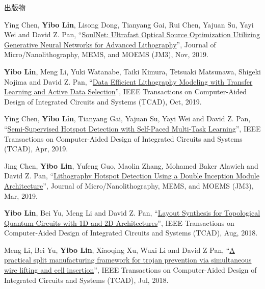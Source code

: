 \begin{rSection}{出版物}
\begin{description}[font=\normalfont]
{}
            

\item[{[J16]}]{
        Ying Chen, \textbf{Yibo Lin}, Lisong Dong, Tianyang Gai, Rui Chen, Yajuan Su, Yayi Wei and David Z. Pan, 
    ``\href{https://dx.doi.org/10.1117/1.JMM.18.4.043506}{SoulNet: Ultrafast Optical Source Optimization Utilizing Generative Neural Networks for Advanced Lithography}'', 
    Journal of Micro/Nanolithography, MEMS, and MOEMS (JM3), Nov, 2019.
    
}
            

\item[{[J15]}]{
        \textbf{Yibo Lin}, Meng Li, Yuki Watanabe, Taiki Kimura, Tetsuaki Matsunawa, Shigeki Nojima and David Z. Pan, 
    ``\href{https://doi.org/10.1109/TCAD.2018.2864251}{Data Efficient Lithography Modeling with Transfer Learning and Active Data Selection}'', 
    IEEE Transactions on Computer-Aided Design of Integrated Circuits and Systems (TCAD), Oct, 2019.
    
}
            

\item[{[J14]}]{
        Ying Chen, \textbf{Yibo Lin}, Tianyang Gai, Yajuan Su, Yayi Wei and David Z. Pan, 
    ``\href{https://doi.org/10.1109/TCAD.2019.2912948}{Semi-Supervised Hotspot Detection with Self-Paced Multi-Task Learning}'', 
    IEEE Transactions on Computer-Aided Design of Integrated Circuits and Systems (TCAD), Apr, 2019.
    
}
            

\item[{[J13]}]{
        Jing Chen, \textbf{Yibo Lin}, Yufeng Guo, Maolin Zhang, Mohamed Baker Alawieh and David Z. Pan, 
    ``\href{https://doi.org/10.1117/1.JMM.18.1.013507}{Lithography Hotspot Detection Using a Double Inception Module Architecture}'', 
    Journal of Micro/Nanolithography, MEMS, and MOEMS (JM3), Mar, 2019.
    
}
            

\item[{[J12]}]{
        \textbf{Yibo Lin}, Bei Yu, Meng Li and David Z. Pan, 
    ``\href{https://doi.org/10.1109/TCAD.2017.2760511}{Layout Synthesis for Topological Quantum Circuits with 1D and 2D Architectures}'', 
    IEEE Transactions on Computer-Aided Design of Integrated Circuits and Systems (TCAD), Aug, 2018.
    
}
            

\item[{[J11]}]{
        Meng Li, Bei Yu, \textbf{Yibo Lin}, Xiaoqing Xu, Wuxi Li and David Z Pan, 
    ``\href{https://doi.org/10.1109/TCAD.2018.2859402}{A practical split manufacturing framework for trojan prevention via simultaneous wire lifting and cell insertion}'', 
    IEEE Transactions on Computer-Aided Design of Integrated Circuits and Systems (TCAD), Jul, 2018.
    
}
\end{description}
\end{rSection}
